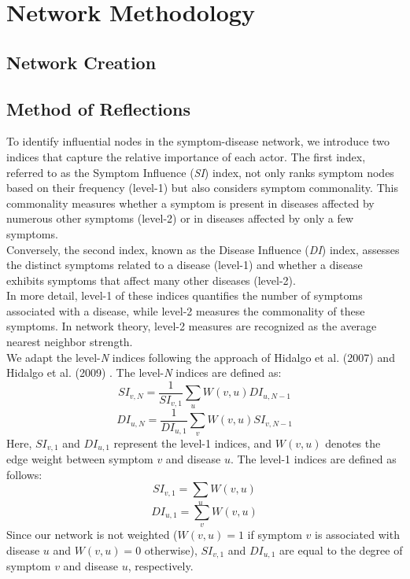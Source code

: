 \section{Network Methodology}

\subsection{Network Creation}


\subsection{Method of Reflections}

To identify influential nodes in the symptom-disease network, we introduce two indices that capture the relative importance of each actor.
The first index, referred to as the Symptom Influence (\textit{SI}) index, not only ranks symptom nodes based on their frequency (level-1)
but also considers symptom commonality.
This commonality measures whether a symptom is present in diseases affected by numerous other symptoms (level-2) or in diseases affected by only a few symptoms.\\
Conversely, the second index, known as the Disease Influence (\textit{DI}) index,
assesses the distinct symptoms related to a disease (level-1) and whether a disease exhibits symptoms that affect many other diseases (level-2).\\
In more detail, level-1 of these indices quantifies the number of symptoms associated with a disease,
while level-2 measures the commonality of these symptoms. In network theory, level-2 measures are recognized as the average nearest neighbor strength.\\
We adapt the level-\textit{N} indices following the approach of Hidalgo et al. (2007) \cite{Hidalgo_2007} and Hidalgo et al. (2009) \cite{Hidalgo_2009}.
The level-\textit{N} indices are defined as:
\begin{equation}
    SI_{v, N} = \frac{1}{SI_{v, 1}} \sum_u W(v, u) DI_{u, N-1}
\end{equation}
\begin{equation}
    DI_{u, N} = \frac{1}{DI_{u, 1}} \sum_v W(v, u) SI_{v, N-1}
\end{equation}
\noindent
Here, $SI_{v, 1}$ and $DI_{u, 1}$ represent the level-1 indices, and $W(v,u)$ denotes the edge weight between symptom $v$ and disease $u$.
The level-1 indices are defined as follows:
\begin{equation}
    SI_{v, 1} = \sum_u W(v, u)
\end{equation}
\begin{equation}
    DI_{u, 1} = \sum_v W(v, u)
\end{equation}
\noindent
Since our network is not weighted ($W(v,u)=1$ if symptom $v$ is associated with disease $u$ and $W(v,u)=0$ otherwise),
$SI_{v,1}$ and $DI_{u,1}$ are equal to the degree of symptom $v$ and disease $u$, respectively.

